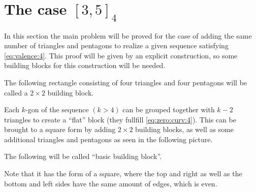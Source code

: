 \section{The case $[3, 5]_4$}
In this section the main problem will be proved for the case of adding the same number of triangles and pentagons to realize a given sequence satisfying \autoref{eq:valence:4}. This proof will be given by an explicit construction, so some building blocks for this construction will be needed.
\begin{definition}
  The following rectangle consisting of four triangles and four pentagons will be called a $2 \times 2$ building block.
  \begin{figure}[htpp]
    \centering
  \end{figure}
\end{definition}

Each $k$-gon of the sequence $(k > 4)$ can be grouped together with $k-2$ triangles to create a ``flat'' block (they fullfill \autoref{eq:zero:curv:4}). This can be brought to a square form by adding $2 \times 2$ building blocks, as well as some additional triangles and pentagons as seen in the following picture.
\begin{definition} The following will be called ``basic building block''.
  \begin{figure}[htpp]
    \centering
  \end{figure}
  Note that it has the form of a square, where the top and right as well as the bottom and left sides have the same amount of edges, which is even.
\end{definition}

